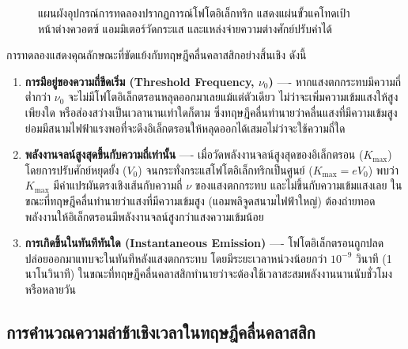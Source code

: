 \begin{figure}[H]
\caption{แผนผังอุปกรณ์การทดลองปรากฏการณ์โฟโตอิเล็กทริก แสดงแผ่นขั้วแคโทดเป้า หน้าต่างควอตซ์ แอมมิเตอร์วัดกระแส และแหล่งจ่ายความต่างศักย์ปรับค่าได้}
\label{fig:photoelectric_apparatus}
\end{figure}

การทดลองแสดงคุณลักษณะที่ขัดแย้งกับทฤษฎีคลื่นคลาสสิกอย่างสิ้นเชิง ดังนี้

\begin{enumerate}
    \item \textbf{การมีอยู่ของความถี่ขีดเริ่ม (Threshold Frequency, $\nu_0$)} ---- หากแสงตกกระทบมีความถี่ต่ำกว่า $\nu_0$ จะไม่มีโฟโตอิเล็กตรอนหลุดออกมาเลยแม้แต่ตัวเดียว ไม่ว่าจะเพิ่มความเข้มแสงให้สูงเพียงใด หรือส่องสว่างเป็นเวลานานเท่าใดก็ตาม ซึ่งทฤษฎีคลื่นทำนายว่าคลื่นแสงที่มีความเข้มสูงย่อมมีสนามไฟฟ้าแรงพอที่จะดึงอิเล็กตรอนให้หลุดออกได้เสมอไม่ว่าจะใช้ความถี่ใด
    \item \textbf{พลังงานจลน์สูงสุดขึ้นกับความถี่เท่านั้น} ---- เมื่อวัดพลังงานจลน์สูงสุดของอิเล็กตรอน ($K_{\max}$) โดยการปรับศักย์หยุดยั้ง ($V_0$) จนกระทั่งกระแสโฟโตอิเล็กทริกเป็นศูนย์ ($K_{\max} = e V_0$) พบว่า $K_{\max}$ มีค่าแปรผันตรงเชิงเส้นกับความถี่ $\nu$ ของแสงตกกระทบ และไม่ขึ้นกับความเข้มแสงเลย ในขณะที่ทฤษฎีคลื่นทำนายว่าแสงที่มีความเข้มสูง (แอมพลิจูดสนามไฟฟ้าใหญ่) ต้องถ่ายทอดพลังงานให้อิเล็กตรอนมีพลังงานจลน์สูงกว่าแสงความเข้มน้อย
    \item \textbf{การเกิดขึ้นในทันทีทันใด (Instantaneous Emission)} ---- โฟโตอิเล็กตรอนถูกปลดปล่อยออกมาแทบจะในทันทีหลังแสงตกกระทบ โดยมีระยะเวลาหน่วงน้อยกว่า $10^{-9}$ วินาที (1 นาโนวินาที) ในขณะที่ทฤษฎีคลื่นคลาสสิกทำนายว่าจะต้องใช้เวลาสะสมพลังงานนานนับชั่วโมงหรือหลายวัน
\end{enumerate}

\subsection{การคำนวณความล่าช้าเชิงเวลาในทฤษฎีคลื่นคลาสสิก}

